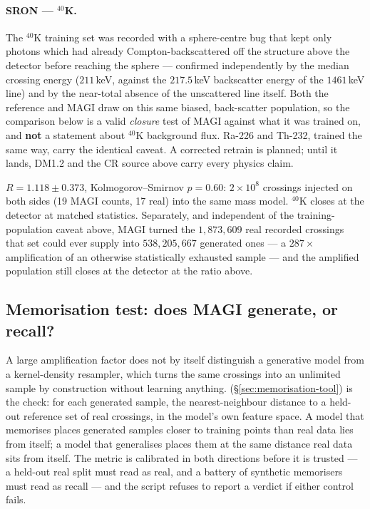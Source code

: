 \documentclass[11pt,a4paper]{article}
\begin{document}
\paragraph{SRON --- $^{40}$K.}

\begin{magiwarn}
The $^{40}$K training set was recorded with a sphere-centre bug that kept only
photons which had already Compton-backscattered off the structure above the
detector before reaching the sphere --- confirmed independently by the median
crossing energy ($211$\,keV, against the $217.5$\,keV backscatter energy of the
$1461$\,keV line) and by the near-total absence of the unscattered line itself.
Both the reference and MAGI draw on this same biased, back-scatter population,
so the comparison below is a valid \emph{closure} test of MAGI against what it
was trained on, and \textbf{not} a statement about $^{40}$K background flux.
Ra-226 and Th-232, trained the same way, carry the identical caveat. A
corrected retrain is planned; until it lands, DM1.2 and the CR source above
carry every physics claim.
\end{magiwarn}

$R = 1.118 \pm 0.373$, Kolmogorov--Smirnov $p=0.60$: $2\times10^8$ crossings
injected on both sides (19 MAGI counts, 17 real) into the same mass model.
$^{40}$K closes at the detector at matched statistics. Separately, and
independent of the training-population caveat above, MAGI turned the
$1{,}873{,}609$ real recorded crossings that set could ever supply into
$538{,}205{,}667$ generated ones --- a $287\times$ amplification of an
otherwise statistically exhausted sample --- and the amplified population
still closes at the detector at the ratio above.

\subsection{Memorisation test: does MAGI generate, or recall?}
\label{sec:memorisation-results}

A large amplification factor does not by itself distinguish a generative model
from a kernel-density resampler, which turns the same crossings into an
unlimited sample by construction without learning anything.
 (\S\ref{sec:memorisation-tool}) is the check: for
each generated sample, the nearest-neighbour distance to a held-out reference
set of real crossings, in the model's own feature space. A model that
memorises places generated samples closer to training points than real data
lies from itself; a model that generalises places them at the same distance
real data sits from itself. The metric is calibrated in both directions before
it is trusted --- a held-out real split must read as real, and a battery of
synthetic memorisers must read as recall --- and the script refuses to report
a verdict if either control fails.
\end{document}
